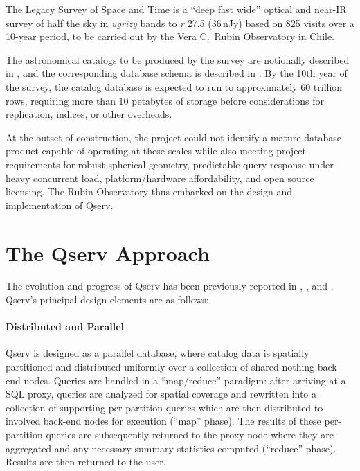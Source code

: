 \documentclass[11pt,twoside]{article}
\begin{document}
The Legacy Survey of Space and Time \citep{2019ApJ...873..111I} is a ``deep fast wide'' optical and near-IR
survey of half the sky in \emph{ugrizy} bands to \emph{r} 27.5 (36\,nJy) based on 825 visits over a 10-year
period, to be carried out by the Vera C.\ Rubin Observatory in Chile.

The astronomical catalogs to be produced by the survey are notionally described in \citet{LSE-163}, and the
corresponding database schema is described in \citet{LDM-153}.  By the 10th year of the survey, the catalog
database is expected to run to approximately 60 trillion rows, requiring more than 10 petabytes of storage
before considerations for replication, indices, or other overheads.

At the outset of construction, the project could not identify a mature database product capable of operating
at these scales while also meeting project requirements for robust spherical geometry, predictable query
response under heavy concurrent load, platform/hardware affordability, and open source licensing.  The Rubin
Observatory thus embarked on the design and implementation of Qserv.

\section{The Qserv Approach}

The evolution and progress of Qserv has been previously reported in \citet{2006SPIE.6270E..0RB},
\citet{2011Wang:2011:QDS:2063348.2063364}, and \citet{LDM-135}.  Qserv's principal design elements are as
follows:

\paragraph {Distributed and Parallel}

Qserv is designed as a parallel database, where catalog data is spatially partitioned and distributed
uniformly over a collection of shared-nothing back-end nodes.  Queries are handled in a ``map/reduce''
paradigm: after arriving at a SQL proxy, queries are analyzed for spatial coverage and rewritten into a
collection of supporting per-partition queries which are then distributed to involved back-end nodes for
execution (``map'' phase). The results of these per-partition queries are subsequently returned to the proxy
node where they are aggregated and any necessary summary statistics computed (``reduce'' phase). Results are
then returned to the user.
\end{document}
